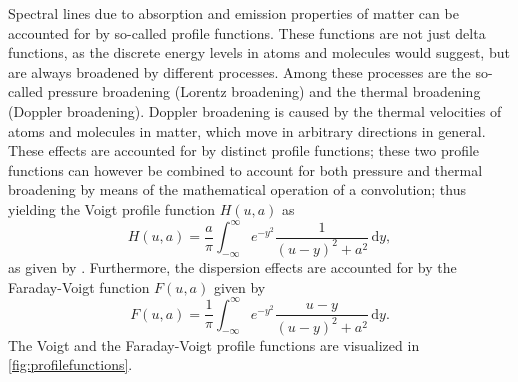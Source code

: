 \documentclass[a4paper,11pt]{report}
\begin{document}
Spectral lines due to absorption and emission properties of matter can be accounted for by so-called profile functions. These functions are not just delta functions, as the discrete energy levels in atoms and molecules would suggest, but are always broadened by different processes. Among these processes are the so-called pressure broadening (Lorentz broadening) and the thermal broadening (Doppler broadening). Doppler broadening is caused by the thermal velocities of atoms and molecules in matter, which move in arbitrary directions in general. These effects are accounted for by distinct profile functions; these two profile functions can however be combined to account for both pressure and thermal broadening by means of the mathematical operation of a convolution; thus yielding the Voigt profile function $H(u,a)$ as \begin{equation}\label{eq:Voigt_Profile}
H(u,a) = \frac{a}{\pi}\int_{-\infty}^{\infty}e^{-y^2}\frac{1}{(u-y)^2+ a^2}\,\mathrm{d}y, \end{equation} as given by \cite[p.100]{delToroIniesta.2003}. Furthermore, the dispersion effects are accounted for by the Faraday-Voigt function $F(u,a)$ given by \begin{equation}\label{eq:Faraday_Voigt_Profile}
F(u,a) = \frac{1}{\pi}\int_{-\infty}^{\infty}e^{-y^2}\frac{u-y}{(u-y)^2+a^2}\,\mathrm{d}y.
\end{equation} The Voigt and the Faraday-Voigt profile functions are visualized in \cref{fig:profilefunctions}.
\end{document}
